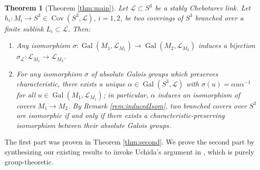 \documentclass{amsart}
\theoremstyle{plain}
\newtheorem{theorem}{Theorem}[section]
\theoremstyle{definition}
\theoremstyle{plain}
\theoremstyle{plain}
\theoremstyle{plain}
\theoremstyle{remark}
\theoremstyle{remark}
\theoremstyle{plain}
\theoremstyle{definition}
\theoremstyle{plain}
\DeclareMathOperator{\Gal}{\mathrm{Gal}}
\DeclareMathOperator{\Cov}{\mathrm{Cov}}
\newcounter{main}
\theoremstyle{plain}
\theoremstyle{plain}
\numberwithin{equation}{section}
\begin{document}
\begin{theorem}[Theorem \ref{thm:main}]
Let $\mathcal{L} \subset S^3$ be a stably Chebotarev link. Let $h_i: M_i \to S^3 \in \Cov(S^3, \mathcal{L})$, $i = 1, 2$, be two coverings of $S^3$ branched over a finite sublink $L_i \subset \mathcal{L}$. Then:
\begin{enumerate}
    \item Any isomorphism $\sigma: \Gal(M_1, \mathcal{L}_{M_1}) \to \Gal(M_2, \mathcal{L}_{M_2})$ induces a bijection $\sigma_{\mathcal L}: \mathcal{L}_{M_1} \rightarrow \mathcal{L}_{M_2}$.
    \item For any isomorphism $\sigma$ of absolute Galois groups which preserves characteristic, there exists a unique $\alpha\in\Gal(S^3,\mathcal{L})$ with $\sigma(u) = \alpha u \alpha^{-1}$ for all $u \in \Gal(M_1, \mathcal L_{M_1})$; in particular, $\alpha$ induces an isomorphism of covers $M_1 \to M_2$. By Remark \ref{rem:inducedIsom}, two branched covers over $S^3$ are isomorphic if and only if there exists a characteristic-preserving isomorphism between their absolute Galois groups. 
\end{enumerate} 
\end{theorem}

The first part was proven in Theorem \ref{thm:second}. We prove the second part by synthesizing our existing results to invoke Uchida's argument in \cite{uchida}, which is purely group-theoretic.
\end{document}
